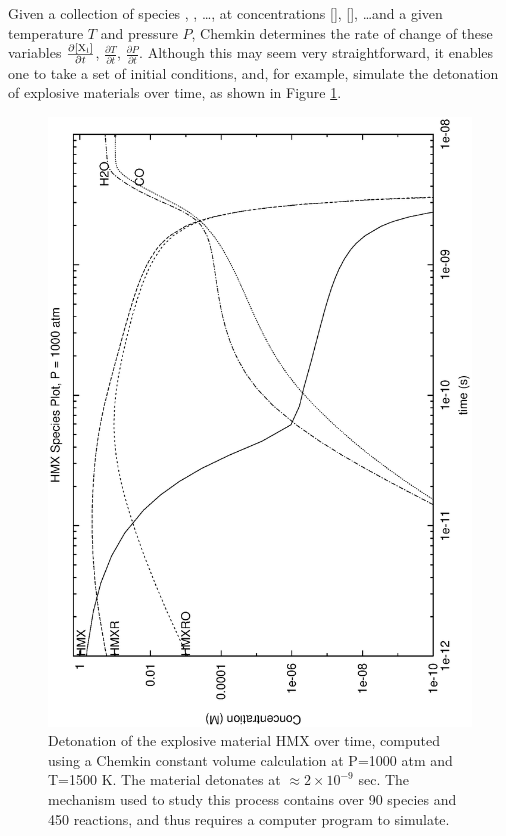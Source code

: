 Given a collection of species , , \dots, at
concentrations [], [], \dots and a given
temperature $T$ and pressure $P$, Chemkin determines the rate of
change of these variables $\frac{\partial[\mathrm{X_i}]}{\partial t}$,
$\frac{\partial T}{\partial t}$, $\frac{\partial P}{\partial
t}$. Although this may seem very straightforward, it enables one to
take a set of initial conditions, and, for example, simulate the
detonation of explosive materials over time, as shown in Figure
\ref{hmx-species}.

\begin{figure}
\begin{center}
\includegraphics[angle=270,scale=0.5]{hmx-species}
\end{center}
\caption{Detonation of the explosive material HMX over time, computed
using a Chemkin constant volume calculation at P=1000 atm and T=1500
K. The material detonates at $\approx 2\times 10^{-9}$ sec. The
mechanism used to study this process contains over 90 species and 450
reactions, and thus requires a computer program to simulate.}
\label{hmx-species}
\end{figure}

